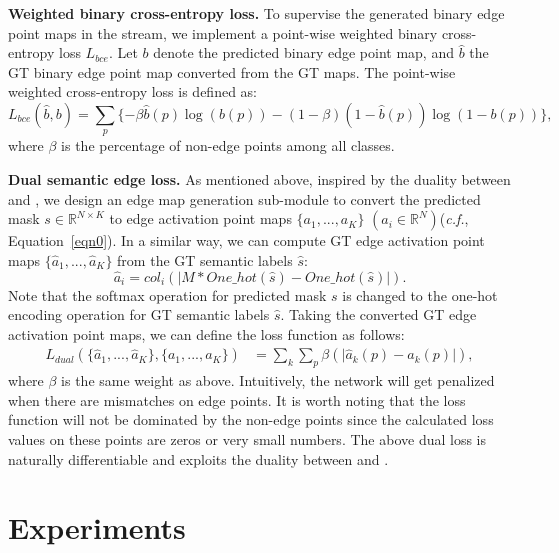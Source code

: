 \documentclass[runningheads]{llncs}
\begin{document}
\smallskip \noindent \textbf{Weighted binary cross-entropy loss.}
To supervise the generated binary edge point maps in the {\SemEdgeD} stream, we implement a point-wise weighted binary cross-entropy loss $L_{bce}$. Let $b$ denote
the predicted binary edge point map, 
and $\hat{b}$ the GT binary edge point map converted from the GT {\SemEdgePoint} maps. The point-wise weighted cross-entropy loss is defined as:
    \begin{equation}
        L_{bce}(\hat{b}, b) = \sum_p\{-\beta \hat{b}(p)\log(b(p)) - (1 - \beta)(1 - \hat{b}(p))\log(1 - b(p))\},
        \label{eqn4}
    \end{equation}
where $\beta$ is the percentage of non-edge points among all classes.

\smallskip \noindent \textbf{Dual semantic edge loss.}
As mentioned above, inspired by the duality between {\SemSeg} and {\SemEdgeD}, we design an edge map generation {sub-module} to convert the predicted {\SemSegPoint} mask $s \in \mathbb{R}^{N \times K}$ to edge activation point maps $\{a_{1},...,a_{K}\}$ $(a_i \in \mathbb{R}^{N})$(\textit{c.f.}, Equation~\ref{eqn0}). In {a}
similar way, we can compute GT edge activation point maps $\{\hat{a}_{1},...,\hat{a}_{K}\}$ from the GT semantic labels $\hat{s}$:
    \begin{equation}
        \hat{a}_i = col_i(\lvert M * One\_hot(\hat{s}) - One\_hot(\hat{s}) \rvert).
        \label{eqn5}
    \end{equation} 
Note that the softmax operation for predicted {\SemSegPoint} mask $s$ is changed to the one-hot encoding operation for GT semantic labels $\hat{s}$. Taking the converted GT edge activation point maps, we can {define the loss function as follows:}
\begin{equation}
        \begin{split}
            L_{dual}(\{\hat{a}_1,...,\hat{a}_K\},  \{a_1,...,a_K\}) & = \sum_k\sum_p \beta (\lvert \hat{a}_k(p) - a_k(p) \rvert),
        \end{split}
        \label{eqn6}        
    \end{equation}
{where $\beta$ is the same weight as above. Intuitively, the network will get penalized when there are mismatches on edge points.}
{It is worth noting that the loss function will not 
be dominated by the non-edge points {since the calculated loss values on these points are zeros or very small numbers}.} The above dual loss is naturally differentiable and exploits the duality between {\SemSeg} and {\SemEdgeD}. 
\section{Experiments}
\end{document}
